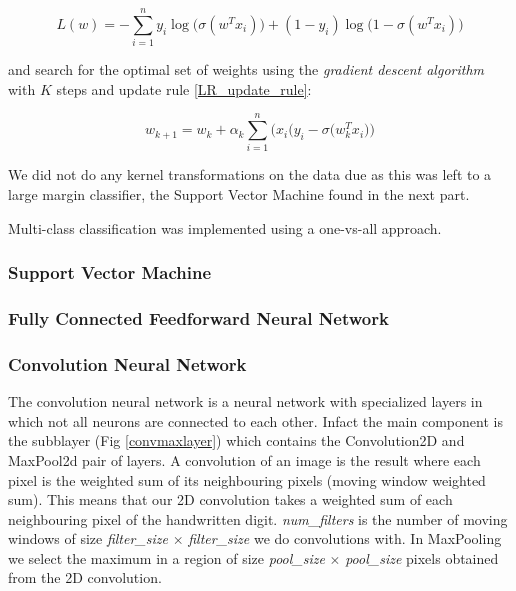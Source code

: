\documentclass[conference]{IEEEtran}
\begin{document}
\begin{equation}
	\label{LL}
	L(w) = -\sum_{i=1}^n y_i\log\Big(\sigma(w^Tx_i)\Big) + (1-y_i)\log\Big(1-\sigma(w^Tx_i)\Big)
\end{equation}

and search for the optimal set of weights using the \emph{gradient descent algorithm} with $K$ steps and update rule \ref{LR_update_rule}:

\begin{equation}
\label{LR_update_rule}
	w_{k+1} = w_k + \alpha_k \sum_{i=1}^n \Big( x_i\big(y_i - \sigma(w_k^Tx_i\big) \Big)
\end{equation}

We did not do any kernel transformations on the data due as this was left to a large margin classifier, the Support Vector Machine found in the next part.

Multi-class classification was implemented using a one-vs-all approach.


\subsubsection{Support Vector Machine}

\subsubsection{Fully Connected Feedforward Neural Network}

\subsubsection{Convolution Neural Network}
The convolution neural network \cite{LeCunn98} is a neural network with specialized layers in which not all neurons are connected to each other. Infact the main component is the subblayer (Fig \ref{convmaxlayer}) which contains the Convolution2D and MaxPool2d pair of layers. A convolution of an image is the result where each pixel is the weighted sum of its neighbouring pixels (moving window weighted sum). This means that our 2D convolution takes a weighted sum of each neighbouring pixel of the handwritten digit. \emph{num\_filters} is the number of moving windows of size \emph{filter\_size} $\times$ \emph{filter\_size} we do convolutions with. In MaxPooling we select the maximum in a region of size \emph{pool\_size} $\times$ \emph{pool\_size} pixels obtained from the 2D convolution.
\end{document}
